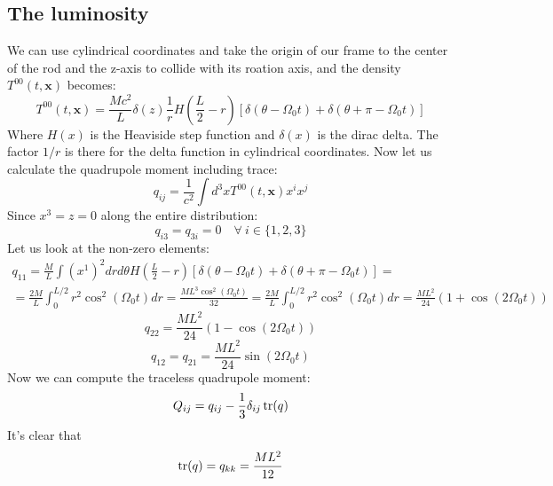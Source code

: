 \documentclass{article}
\begin{document}
\subsection{The luminosity}
We can use cylindrical coordinates and take the origin of our frame to the center of the rod and the z-axis to collide with its roation axis, and the density $T^{00}(t, \boldsymbol{x})$ becomes:
\begin{equation}
    T^{00}(t, \boldsymbol{x}) = \frac{Mc^2}{L}\delta(z)\frac{1}{r}H\left(\frac{L}{2} - r\right)\left[\delta(\theta - \Omega_0 t) + \delta(\theta + \pi - \Omega_0 t)\right]
\end{equation}
Where $H(x)$ is the Heaviside step function and $\delta(x)$ is the dirac delta. The factor $1/r$ is there for the delta function in cylindrical coordinates. Now let us calculate the quadrupole moment including trace:
\begin{equation}
    q_{ij} = \frac{1}{c^2}\int d^3x T^{00}(t, \boldsymbol{x})x^ix^j
\end{equation}
Since $x^3 = z = 0$ along the entire distribution:
\begin{equation}
    q_{i3} = q_{3i} = 0 \quad \forall \ i \in \{1,2,3\}
\end{equation}
Let us look at the non-zero elements:
\begin{equation}
\begin{gathered}
    q_{11} = \frac{M}{L}\int \left(x^1\right)^2 drd\theta H\left(\frac{L}{2} - r\right)\left[\delta(\theta - \Omega_0 t) + \delta(\theta + \pi - \Omega_0 t)\right] = \\
    = \frac{2M}{L} \int_0^{L/2} r^2\cos^2(\Omega_0 t) dr = \frac{M L^3 \cos^2(\Omega_0 t)}{32} = \frac{2M}{L} \int_0^{L/2} r^2\cos^2(\Omega_0 t) dr = \frac{M L^2}{24}\left(1 + \cos(2\Omega_0 t)\right)
\end{gathered}
\end{equation}
\begin{equation}
    q_{22} = \frac{M L^2}{24}\left(1 - \cos(2\Omega_0 t)\right)
\end{equation}
\begin{equation}
    q_{12} = q_{21} = \frac{M L^2}{24}\sin(2\Omega_0 t)
\end{equation}
Now we can compute the traceless quadrupole moment:
\begin{equation}
    Q_{ij} = q_{ij} - \frac{1}{3}\delta_{ij} \tr(q)
\end{equation}
It's clear that
\begin{equation}
    \tr(q) = q_{kk} = \frac{ML^2}{12}
\end{equation}
\end{document}
